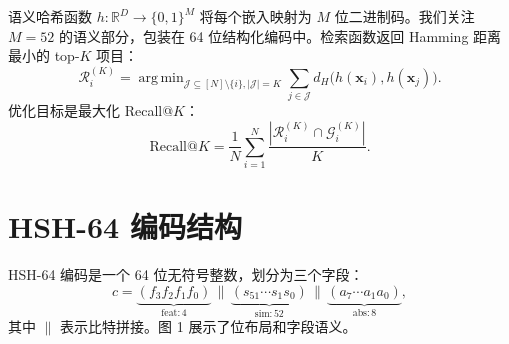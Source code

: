\documentclass[11pt,a4paper]{article}
\DeclareMathOperator*{\argmin}{arg\,min}
\begin{document}
语义哈希函数 $h: \mathbb{R}^D \to \{0,1\}^M$ 将每个嵌入映射为 $M$ 位二进制码。我们关注 $M=52$ 的语义部分，包装在 64 位结构化编码中。检索函数返回 Hamming 距离最小的 top-$K$ 项目：
\begin{equation}
    \mathcal{R}_i^{(K)} = \argmin_{\mathcal{J} \subseteq [N] \setminus \{i\}, |\mathcal{J}|=K} \sum_{j \in \mathcal{J}} d_H\bigl(h(\mathbf{x}_i), h(\mathbf{x}_j)\bigr).
\end{equation}
优化目标是最大化 Recall@$K$：
\begin{equation}
    \text{Recall@}K = \frac{1}{N} \sum_{i=1}^{N} \frac{| \mathcal{R}_i^{(K)} \cap \mathcal{G}_i^{(K)} |}{K}.
\end{equation}

\section{HSH-64 编码结构}

HSH-64 编码是一个 64 位无符号整数，划分为三个字段：
\begin{equation}
    c = \underbrace{(f_3 f_2 f_1 f_0)}_{\text{feat}: 4}
    \,\|\,
    \underbrace{(s_{51} \cdots s_1 s_0)}_{\text{sim}: 52}
    \,\|\,
    \underbrace{(a_7 \cdots a_1 a_0)}_{\text{abs}: 8},
\end{equation}
其中 $\|$ 表示比特拼接。图 1 展示了位布局和字段语义。
\end{document}
